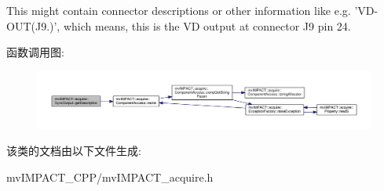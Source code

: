 This might contain connector descriptions or other information like e.\+g. 'V\+D-\/\+O\+U\+T(J9.)', which means, this is the V\+D output at connector J9 pin 24. 

函数调用图\+:
\nopagebreak
\begin{figure}[H]
\begin{center}
\leavevmode
\includegraphics[width=350pt]{classmv_i_m_p_a_c_t_1_1acquire_1_1_sync_output_a62221bcc005c6ca966d8d57e9d74e9e7_cgraph}
\end{center}
\end{figure}




该类的文档由以下文件生成\+:\begin{DoxyCompactItemize}
\item 
mv\+I\+M\+P\+A\+C\+T\+\_\+\+C\+P\+P/mv\+I\+M\+P\+A\+C\+T\+\_\+acquire.\+h\end{DoxyCompactItemize}
